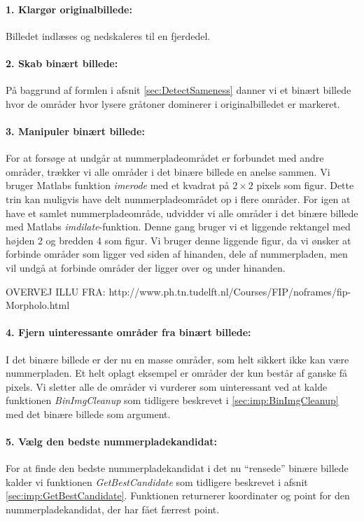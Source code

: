 \paragraph{1. Klargør originalbillede:}
Billedet indlæses og nedskaleres til en fjerdedel. 

\paragraph{2. Skab binært billede:}
På baggrund af formlen i afsnit \ref{sec:DetectSameness} danner vi et binært billede hvor de områder hvor lysere gråtoner dominerer i originalbilledet er markeret.

\paragraph{3. Manipuler binært billede:}
For at forsøge at undgår at nummerpladeområdet er forbundet med andre områder, trækker vi alle områder i det binære billede en anelse sammen. Vi bruger Matlabs funktion \textit{imerode} med et kvadrat på $2 \times 2$ pixels som figur. Dette trin kan muligvis have delt nummerpladeområdet op i flere områder. For igen at have et samlet nummerpladeområde, udvidder vi alle områder i det binære billede med Matlabs \textit{imdilate}-funktion. Denne gang bruger vi et liggende rektangel med højden 2 og bredden 4 som figur. Vi bruger denne liggende figur, da vi ønsker at forbinde områder som ligger ved siden af hinanden, dele af nummerpladen, men vil undgå at forbinde områder der ligger over og under hinanden. 

OVERVEJ ILLU FRA: http://www.ph.tn.tudelft.nl/Courses/FIP/noframes/fip-Morpholo.html

\paragraph{4. Fjern uinteressante områder fra binært billede:}
I det binære billede er der nu en masse områder, som helt sikkert ikke kan være nummerpladen. Et helt oplagt eksempel er områder der kun består af ganske få pixels. Vi sletter alle de områder vi vurderer som uinteressant ved at kalde funktionen \textit{BinImgCleanup} som tidligere beskrevet i \vref{sec:imp:BinImgCleanup} med det binære billede som argument.

\paragraph{5. Vælg den bedste nummerpladekandidat:}
For at finde den bedste nummerpladekandidat i det nu ``rensede'' binære billede kalder vi funktionen \textit{GetBestCandidate} som tidligere beskrevet i afsnit \vref{sec:imp:GetBestCandidate}. Funktionen returnerer koordinater og point for den nummerpladekandidat, der har fået færrest point. 

